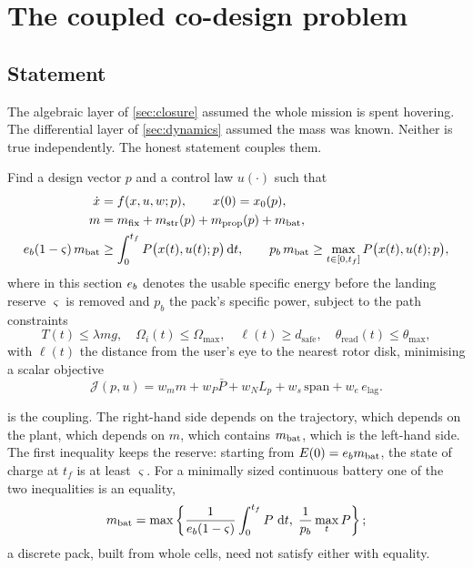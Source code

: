 ﻿\section{The coupled co-design problem}
\label{sec:codesign}

\subsection{Statement}

The algebraic layer of \cref{sec:closure} assumed the whole mission is spent
hovering. The differential layer of \cref{sec:dynamics} assumed the mass was
known. Neither is true independently. The honest statement couples them.

\begin{problem}[Co-design]
\label{prob:codesign}
Find a design vector $p$ and a control law $u(\cdot)$ such that
\begin{align}
  \dot{x} &= f(x,u,w;p), \qquad x(0)=x_0(p), \label{eq:cd1}\\
  m &= m_{\mathrm{fix}} + m_{\mathrm{str}}(p) + m_{\mathrm{prop}}(p) + m_{\mathrm{bat}}, \label{eq:cd2}\\
  e_b(1-\varsigma)\,m_{\mathrm{bat}} &\ge \int_0^{t_f} P\big(x(t),u(t);p\big)\,\mathrm{d} t ,
  \qquad
  p_b\,m_{\mathrm{bat}} \ge \max_{t\in[0,t_f]} P\big(x(t),u(t);p\big), \label{eq:cd3}
\end{align}
where in this section $e_b$ denotes the usable specific energy before the
landing reserve $\varsigma$ is removed and $p_b$ the pack's specific power,
subject to the path constraints
\begin{equation}
  T(t)\le\lambda mg,\quad
  \Omega_i(t)\le\Omega_{\max},\quad
  \ell(t)\ge d_{\mathrm{safe}},\quad
  \theta_{\mathrm{read}}(t)\le\theta_{\max},
  \label{eq:cd4}
\end{equation}
with $\ell(t)$ the distance from the user's eye to the nearest rotor disk,
minimising a scalar objective
\begin{equation}
  \mathcal{J}(p,u) = w_m m + w_P \bar P + w_N L_p + w_s\,\mathrm{span}
                     + w_e\, e_{\mathrm{lag}} .
  \label{eq:cd5}
\end{equation}
\end{problem}

 is the coupling. The right-hand side depends on the trajectory,
which depends on the plant, which depends on $m$, which contains $m_{\mathrm{bat}}$, which
is the left-hand side. The first inequality keeps the reserve: starting from
$E(0)=e_bm_{\mathrm{bat}}$, the state of charge at $t_f$ is at least $\varsigma$. For a
minimally sized continuous battery one of the two inequalities is an equality,
\begin{equation}
  m_{\mathrm{bat}} = \max\left\{\frac{1}{e_b(1-\varsigma)}\int_0^{t_f}P\,\,\mathrm{d} t,\;
                     \frac{1}{p_b}\max_t P\right\} ;
  \label{eq:batreq}
\end{equation}
a discrete pack, built from whole cells, need not satisfy either with equality.


